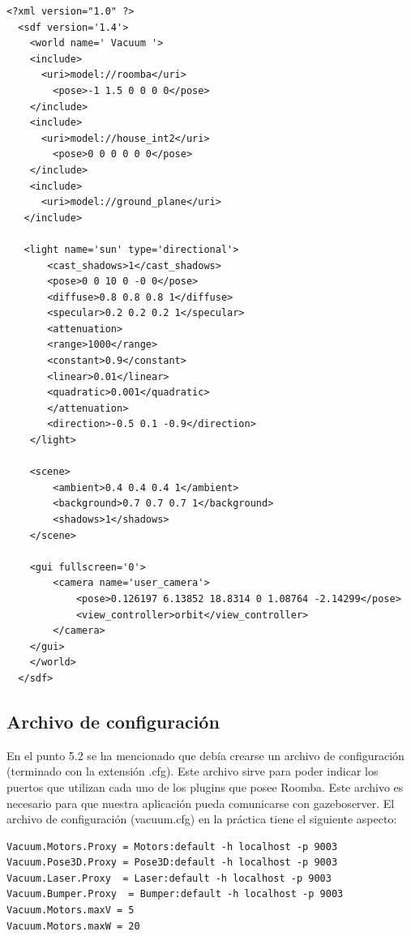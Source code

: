 \vspace{20pt}
	\begin{lstlisting}[frame=single]
<?xml version="1.0" ?>
  <sdf version='1.4'>
    <world name=' Vacuum '>
    <include>
      <uri>model://roomba</uri>
        <pose>-1 1.5 0 0 0 0</pose>
    </include>
    <include>
      <uri>model://house_int2</uri>
        <pose>0 0 0 0 0 0</pose>
    </include>
    <include>
      <uri>model://ground_plane</uri>
   </include>

   <light name='sun' type='directional'>
       <cast_shadows>1</cast_shadows>
       <pose>0 0 10 0 -0 0</pose>
       <diffuse>0.8 0.8 0.8 1</diffuse>
       <specular>0.2 0.2 0.2 1</specular>
       <attenuation>
       <range>1000</range>
       <constant>0.9</constant>
       <linear>0.01</linear>
       <quadratic>0.001</quadratic>
       </attenuation>
       <direction>-0.5 0.1 -0.9</direction>
    </light>

    <scene>
        <ambient>0.4 0.4 0.4 1</ambient>
        <background>0.7 0.7 0.7 1</background>
        <shadows>1</shadows>
    </scene>

    <gui fullscreen='0'>
        <camera name='user_camera'>
            <pose>0.126197 6.13852 18.8314 0 1.08764 -2.14299</pose>
            <view_controller>orbit</view_controller>
        </camera>
    </gui>
    </world>
  </sdf>

	\end{lstlisting}

\subsection{Archivo de configuración}
En el punto 5.2 se ha mencionado que debía crearse un archivo de configuración (terminado con la extensión .cfg). Este archivo sirve para poder indicar los puertos que utilizan cada uno de los plugins que posee Roomba. Este archivo es necesario para que nuestra aplicación pueda comunicarse con gazeboserver. El archivo de configuración (vacuum.cfg) en la práctica tiene el siguiente aspecto: 

\vspace{20pt}
	\begin{lstlisting}[frame=single]
Vacuum.Motors.Proxy = Motors:default -h localhost -p 9003
Vacuum.Pose3D.Proxy = Pose3D:default -h localhost -p 9003
Vacuum.Laser.Proxy  = Laser:default -h localhost -p 9003
Vacuum.Bumper.Proxy  = Bumper:default -h localhost -p 9003
Vacuum.Motors.maxV = 5
Vacuum.Motors.maxW = 20

	\end{lstlisting}
	

